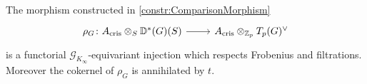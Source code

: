 \begin{thm}\label{ComparisonTheorem}
	The morphism constructed in \cref{constr:ComparisonMorphism}
	\begin{equation*}
	\begin{tikzcd}[row sep = 0ex
		,/tikz/column 1/.append style={anchor=base east}
		,/tikz/column 2/.append style={anchor=base west}]
		\rho_G\colon A_{\mathrm{cris}} \otimes_S \mathbb{D}^*(G)(S) 
		\arrow[r, "", rightarrow] &
		A_{\mathrm{cris}} \otimes_{\mathbb{Z}_{p}} T_p(G)^\vee
	\end{tikzcd}
	\end{equation*} 
	is a functorial $\mathscr{G}_{K_\infty}$-equivariant injection 
	which respects Frobenius and filtrations.
	Moreover the cokernel of $\rho_G$ is annihilated by $t$.
\end{thm}
